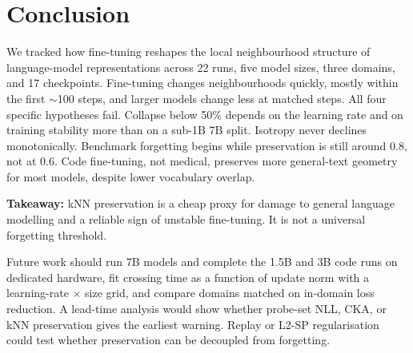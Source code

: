 \section{Conclusion}
\label{sec:conclusion}

We tracked how fine-tuning reshapes the local neighbourhood structure of language-model representations across 22 runs, five model sizes, three domains, and 17 checkpoints. Fine-tuning changes neighbourhoods quickly, mostly within the first $\sim$100 steps, and larger models change less at matched steps. All four specific hypotheses fail. Collapse below 50\% depends on the learning rate and on training stability more than on a sub-1B \versus 7B split. Isotropy never declines monotonically. Benchmark forgetting begins while preservation is still around 0.8, not at 0.6. Code fine-tuning, not medical, preserves more general-text geometry for most models, despite lower vocabulary overlap.

{\bf Takeaway:} kNN preservation is a cheap proxy for damage to general language modelling and a reliable sign of unstable fine-tuning. It is not a universal forgetting threshold.

Future work should run 7B models and complete the 1.5B and 3B code runs on dedicated hardware, fit crossing time as a function of update norm with a learning-rate $\times$ size grid, and compare domains matched on in-domain loss reduction. A lead-time analysis would show whether probe-set NLL, CKA, or kNN preservation gives the earliest warning. Replay or L2-SP regularisation~\citep{li2018explicit} could test whether preservation can be decoupled from forgetting.
